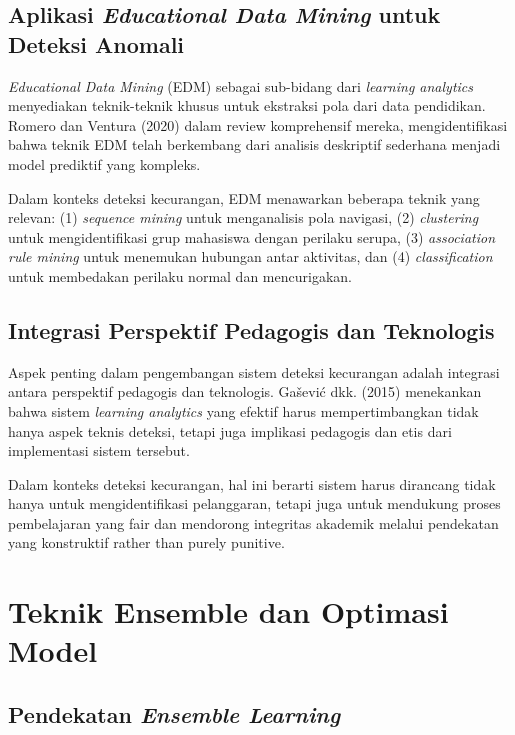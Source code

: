 \subsection{Aplikasi \textit{Educational Data Mining} untuk Deteksi Anomali}

\textit{Educational Data Mining} (EDM) sebagai sub-bidang dari \textit{learning analytics} menyediakan teknik-teknik khusus untuk ekstraksi pola dari data pendidikan. Romero dan Ventura (2020) dalam review komprehensif mereka, mengidentifikasi bahwa teknik EDM telah berkembang dari analisis deskriptif sederhana menjadi model prediktif yang kompleks.

Dalam konteks deteksi kecurangan, EDM menawarkan beberapa teknik yang relevan: (1) \textit{sequence mining} untuk menganalisis pola navigasi, (2) \textit{clustering} untuk mengidentifikasi grup mahasiswa dengan perilaku serupa, (3) \textit{association rule mining} untuk menemukan hubungan antar aktivitas, dan (4) \textit{classification} untuk membedakan perilaku normal dan mencurigakan.

\subsection{Integrasi Perspektif Pedagogis dan Teknologis}

Aspek penting dalam pengembangan sistem deteksi kecurangan adalah integrasi antara perspektif pedagogis dan teknologis. Gašević dkk. (2015) menekankan bahwa sistem \textit{learning analytics} yang efektif harus mempertimbangkan tidak hanya aspek teknis deteksi, tetapi juga implikasi pedagogis dan etis dari implementasi sistem tersebut.

Dalam konteks deteksi kecurangan, hal ini berarti sistem harus dirancang tidak hanya untuk mengidentifikasi pelanggaran, tetapi juga untuk mendukung proses pembelajaran yang fair dan mendorong integritas akademik melalui pendekatan yang konstruktif rather than purely punitive.

\section{Teknik Ensemble dan Optimasi Model}
\label{sec:ensembleTechniques}

\subsection{Pendekatan \textit{Ensemble Learning}}

